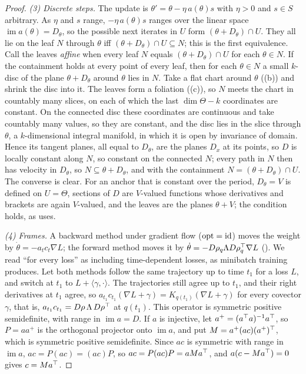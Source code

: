 \begin{proof}
\emph{(3) Discrete steps.} The update is $\theta'=\theta-\eta\,a(\theta)s$ with $\eta>0$ and $s\in S$ arbitrary. As $\eta$
and $s$ range, $-\eta\,a(\theta)s$ ranges over the linear space $\operatorname{im}a(\theta)=D_\theta$, so the possible next
iterates in $U$ form $(\theta+D_\theta)\cap U$. They all lie on the leaf $N$ through $\theta$ iff $(\theta+D_\theta)\cap
U\subseteq N$; this is the first equivalence. Call the leaves \emph{affine} when every leaf $N$ equals $(\theta+D_\theta)\cap
U$ for each $\theta\in N$. If the containment holds at every point of every leaf, then for each $\theta\in N$ a small
$k$-disc of the plane $\theta+D_\theta$ around $\theta$ lies in $N$. Take a flat chart around $\theta$ ((b)) and
shrink the disc into it. The leaves form a foliation ((c)), so $N$ meets the chart in countably many slices, on
each of which the last $\dim\Theta-k$ coordinates are constant. On the connected disc these coordinates are continuous and
take countably many values, so they are constant, and the disc lies in the slice through $\theta$, a $k$-dimensional integral
manifold, in which it is open by invariance of domain. Hence its tangent planes, all equal to $D_\theta$, are the planes
$D_x$ at its points, so $D$ is
locally constant along $N$, so constant on the connected $N$; every path in $N$ then has velocity in $D_\theta$, so
$N\subseteq\theta+D_\theta$, and with the containment $N=(\theta+D_\theta)\cap U$. The converse is clear. For an anchor that is constant over the period, $D_\theta=V$ is defined
on $U=\Theta$, sections of $D$ are $V$-valued functions whose derivatives and brackets are again $V$-valued, and the leaves
are the planes $\theta+V$; the condition holds, as  uses.

\emph{(4) Frames.} A backward method under gradient flow ($\mathrm{opt}=\mathrm{id}$) moves the weight by
$\dot\theta=-a_tc_t\nabla L$; the forward method moves it by $\dot\theta=-D\rho_q\Lambda D\rho_q^{\top}\nabla L$
(). We read ``for every loss'' as including time-dependent losses, as minibatch training produces.
Let both methods follow the same trajectory up to time $t_1$ for a loss $L$, and switch at $t_1$ to $L+\langle\gamma,\cdot\rangle$.
The trajectories still agree up to $t_1$, and their right derivatives at $t_1$ agree, so
$a_{t_1}c_{t_1}(\nabla L+\gamma)=K_{q(t_1)}(\nabla L+\gamma)$ for every covector $\gamma$, that is,
$a_{t_1}c_{t_1}=D\rho\,\Lambda\,D\rho^{\top}$ at $q(t_1)$. This operator is symmetric positive semidefinite, with range in
$\operatorname{im}a=D$. If $a$ is injective, let $a^+=(a^{\top} a)^{-1}a^{\top}$, so $P=aa^+$ is the orthogonal projector onto
$\operatorname{im}a$, and put $M=a^+(ac)(a^+)^{\top}$, which is symmetric positive semidefinite. Since $ac$ is symmetric with
range in $\operatorname{im}a$, $ac=P(ac)=(ac)P$, so $ac=P(ac)P=aMa^{\top}$, and $a(c-Ma^{\top})=0$ gives $c=Ma^{\top}$.


\end{proof}
